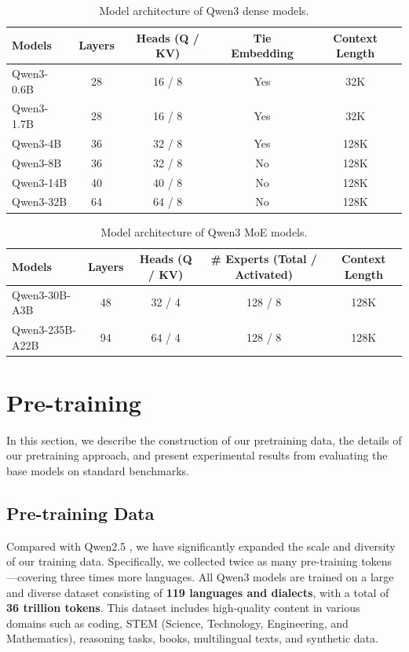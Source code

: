 \documentclass[dvipsnames]{article}
\begin{document}
\begin{table}[htbp]
\caption{Model architecture of Qwen3 dense models.\label{tab:arch-dense}}
\small
\centering
\begin{tabular}{@{}lcccc@{}} 
\toprule
Models  & Layers & Heads (Q / KV) & Tie Embedding & Context Length  \\
\midrule
Qwen3-0.6B  & 28 & 16 / 8 & Yes & 32K   \\
Qwen3-1.7B  & 28 & 16 / 8 & Yes & 32K   \\
Qwen3-4B  & 36 & 32 / 8 & Yes & 128K  \\
Qwen3-8B  & 36 & 32 / 8 & No & 128K  \\
Qwen3-14B & 40 & 40 / 8 & No & 128K  \\
Qwen3-32B & 64 & 64 / 8 & No & 128K  \\
\bottomrule
\end{tabular}
\end{table}

\begin{table}[htbp]
\caption{Model architecture of Qwen3 MoE models.\label{tab:arch-moe}}
\small
\centering
\begin{tabular}{@{}lcccc@{}} 
\toprule
Models  & Layers & Heads (Q / KV) & \# Experts (Total / Activated) & Context Length  \\
\midrule
Qwen3-30B-A3B  & 48 & 32 / 4 &128 / 8  & 128K   \\
Qwen3-235B-A22B  & 94 & 64 / 4 &128 / 8  & 128K  \\
\bottomrule
\end{tabular}
\end{table}

\section{Pre-training}

In this section, we describe the construction of our pretraining data, the details of our pretraining approach, and present experimental results from evaluating the base models on standard benchmarks.

\label{sec:pre}

\subsection{Pre-training Data}
Compared with Qwen2.5 \citep{qwen2.5}, we have significantly expanded the scale and diversity of our training data. Specifically, we collected twice as many pre-training tokens—covering three times more languages. All Qwen3 models are trained on a large and diverse dataset consisting of \textbf{119 languages and dialects}, with a total of \textbf{36 trillion tokens}. This dataset includes high-quality content in various domains such as coding, STEM (Science, Technology, Engineering, and Mathematics), reasoning tasks, books, multilingual texts, and synthetic data.
\end{document}
